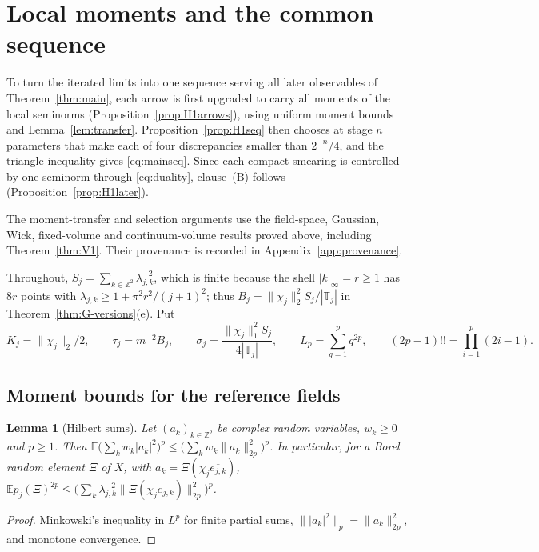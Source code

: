 \documentclass[11pt]{article}
\theoremstyle{plain}
\newtheorem{lemma}[theorem]{Lemma}
\theoremstyle{definition}
\theoremstyle{remark}
\newcommand{\Z}{\mathbb{Z}}
\newcommand{\E}{\mathbb{E}}
\newcommand{\T}{\mathbb{T}}
\newcommand{\conj}[1]{\overline{#1}}
\begin{document}
\section{Local moments and the common sequence}\label{sec:H1}

To turn the iterated limits into one sequence serving all later observables of Theorem~\ref{thm:main}, each arrow is first upgraded to carry all moments of the local seminorms (Proposition~\ref{prop:H1arrows}), using uniform moment bounds and Lemma~\ref{lem:transfer}. Proposition~\ref{prop:H1seq} then chooses at stage $n$ parameters that make each of four discrepancies smaller than $2^{-n}/4$, and the triangle inequality gives \eqref{eq:mainseq}. Since each compact smearing is controlled by one seminorm through \eqref{eq:duality}, clause~(B) follows (Proposition~\ref{prop:H1later}).

The moment-transfer and selection arguments use the field-space, Gaussian, Wick, fixed-volume and continuum-volume results proved above, including Theorem~\ref{thm:V1}. Their provenance is recorded in Appendix~\ref{app:provenance}.

Throughout, $S_j=\sum_{k\in\Z^{2}}\lambda_{j,k}^{-2}$, which is finite because the shell
$|k|_\infty=r\ge1$ has $8r$ points with $\lambda_{j,k}\ge1+\pi^{2}r^{2}/(j+1)^{2}$; thus
$B_j=\|\chi_j\|_2^{2}S_j/|\T_j|$ in Theorem~\ref{thm:G-versions}(e). Put
\[
K_j=\|\chi_j\|_2/2,\qquad\tau_j=m^{-2}B_j,\qquad
\sigma_j=\frac{\|\chi_j\|_1^{2}S_j}{4|\T_j|},\qquad
L_p=\sum_{q=1}^{p}q^{2p},\qquad (2p-1)!!=\prod_{i=1}^{p}(2i-1).
\]

\subsection{Moment bounds for the reference fields}

\begin{lemma}[Hilbert sums]\label{lem:hilbertsum}
Let $(a_k)_{k\in\Z^{2}}$ be complex random variables, $w_k\ge0$ and $p\ge1$. Then
$\E\bigl(\sum_kw_k|a_k|^{2}\bigr)^{p}\le\bigl(\sum_kw_k\|a_k\|_{2p}^{2}\bigr)^{p}$. In particular,
for a Borel random element $\Xi$ of $X$, with $a_k=\Xi(\chi_j\conj{e_{j,k}})$,
$\E p_j(\Xi)^{2p}\le\bigl(\sum_k\lambda_{j,k}^{-2}\|\Xi(\chi_j\conj{e_{j,k}})\|_{2p}^{2}\bigr)^{p}$.
\end{lemma}

\begin{proof}
Minkowski's inequality in $L^{p}$ for finite partial sums,
$\||a_k|^{2}\|_p=\|a_k\|_{2p}^{2}$, and monotone convergence.
\end{proof}
\end{document}
